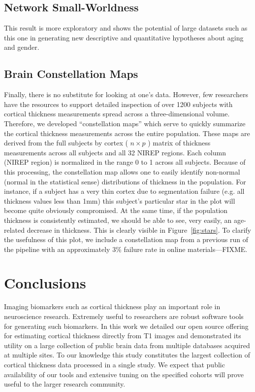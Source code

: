 \subsection{Network Small-Worldness}
This result is more exploratory and shows the potential of large
datasets such as this one in generating new descriptive and
quantitative hypotheses about aging and gender.  

\subsection{Brain Constellation Maps}
Finally, there is no substitute for looking at one's data.  However,
few researchers have the resources to support detailed 
inspection of over 1200 subjects with cortical thickness
measurements spread across a three-dimensional volume.  Therefore, we
developed ``constellation maps'' which serve to quickly summarize the
cortical thickness measurements across the entire population.   These
maps are derived from the full subjects by cortex ( $n \times p$ ) matrix of thickness measurements
across all subjects and all 32 NIREP regions.  Each column (NIREP
region) is normalized in the range 0 to 1 across all subjects.
Because of this processing, the constellation map allows one to
easily identify non-normal (normal in the statistical sense)
distributions of thickness in the population.  For instance, if a
subject has a very thin cortex due to segmentation failure (e.g. all
thickness values less than 1mm) this subject's particular star
in the plot will become quite obviously compromised.  At the same
time, if the population thickness is consistently estimated, we should
be able to see, very easily, an age-related decrease in thickness.
This is clearly visible in Figure~\ref{fig:stars}.  To clarify the
usefulness of this plot, we include a constellation map from a
previous run of the pipeline with an approximately 3\% failure rate in
online materials---FIXME. 

\section{Conclusions}

Imaging biomarkers such as cortical thickness play an 
important role in neuroscience research.  Extremely useful to
researchers are robust software tools for generating such 
biomarkers.  In this work we detailed our open source offering for estimating
cortical thickness directly from T1 images and demonstrated
its utility on a large collection of public brain data from
multiple databases acquired at multiple sites.  To our knowledge
this study constitutes the largest collection of cortical
thickness data processed in a single study.  
We expect that public availability of our tools and extensive tuning on 
the specified cohorts will prove useful to the larger
research community.  


